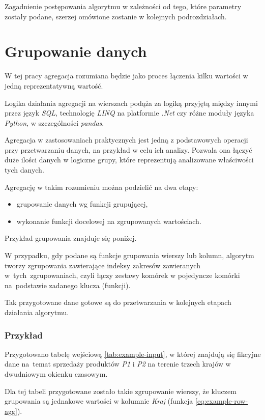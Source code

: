 \documentclass[brudnopis]{xmgr}
\begin{document}
Zagadnienie postępowania algorytmu w zależności od tego, które parametry zostały podane, szerzej omówione zostanie w kolejnych podrozdziałach.


\section{Grupowanie danych}

W tej pracy agregacja rozumiana będzie jako proces łączenia kilku wartości w jedną reprezentatywną wartość.
\medskip

Logika działania agregacji na wierszach podąża za logiką przyjętą między innymi przez język \emph{SQL}, technologię \emph{LINQ} \cite{linq} na platformie \emph{.Net} czy różne moduły języka \emph{Python}, w szczególności \emph{pandas}.
\medskip

Agregacja w zastosowaniach praktycznych jest jedną z podstawowych operacji przy przetwarzaniu danych, na przykład w celu ich analizy.
Pozwala ona łączyć duże ilości danych w logiczne grupy, które reprezentują analizowane właściwości tych danych.
\medskip

Agregację w takim rozumieniu można podzielić na dwa etapy:
\begin{itemize}
    \item grupowanie danych wg funkcji grupującej,
    \item wykonanie funkcji docelowej na zgrupowanych wartościach.
\end{itemize}
\medskip

Przykład grupowania znajduje się poniżej.
\medskip

W przypadku, gdy podane są funkcje grupowania wierszy lub kolumn, algorytm tworzy zgrupowania zawierające indeksy zakresów zawieranych w~tych~zgrupowaniach, czyli łączy zestawy komórek w pojedyncze komórki na~podstawie zadanego klucza (funkcji).
\medskip

Tak przygotowane dane gotowe są do przetwarzania w kolejnych etapach działania algorytmu.

\subsubsection{Przykład}
\medskip

Przygotowano tabelę wejściową \ref{tab:example-input}, w której znajdują się fikcyjne dane na~temat sprzedaży produktów \emph{P1} i \emph{P2} na terenie trzech krajów w dwudniowym okienku czasowym.
\medskip

Dla tej tabeli przygotowane zostało takie zgrupowanie wierszy, że kluczem grupowania są jednakowe wartości w kolumnie \emph{Kraj} (funkcja \ref{eq:example-row-agg}).
\medskip
\end{document}
